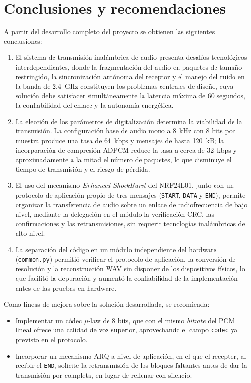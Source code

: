 
\section{Conclusiones y recomendaciones}

A partir del desarrollo completo del proyecto se obtienen las siguientes conclusiones:

\begin{enumerate}
    \item El sistema de transmisión inalámbrica de audio presenta desafíos tecnológicos interdependientes, donde la fragmentación del audio en paquetes de tamaño restringido, la sincronización autónoma del receptor y el manejo del ruido en la banda de \SI{2.4}{\giga\hertz} constituyen los problemas centrales de diseño, cuya solución debe satisfacer simultáneamente la latencia máxima de $60$ segundos, la confiabilidad del enlace y la autonomía energética.

    \item La elección de los parámetros de digitalización determina la viabilidad de la transmisión.
    La configuración base de audio mono a \SI{8}{\kilo\hertz} con $8$ bits por muestra produce una tasa de \SI{64}{kbps} y mensajes de hasta \SI{120}{kB}; la incorporación de compresión ADPCM reduce la tasa a cerca de \SI{32}{kbps} y aproximadamente a la mitad el número de paquetes, lo que disminuye el tiempo de transmisión y el riesgo de pérdida.

    \item El uso del mecanismo \textit{Enhanced ShockBurst} del NRF24L01, junto con un protocolo de aplicación propio de tres mensajes (\texttt{START}, \texttt{DATA} y \texttt{END}), permite organizar la transferencia de audio sobre un enlace de radiofrecuencia de bajo nivel, mediante la delegación en el módulo la verificación CRC, las confirmaciones y las retransmisiones, sin requerir tecnologías inalámbricas de alto nivel.

    \item La separación del código en un módulo independiente del hardware (\texttt{common.py}) permitió verificar el protocolo de aplicación, la conversión de resolución y la reconstrucción WAV sin disponer de los dispositivos físicos, lo que facilitó la depuración y aumentó la confiabilidad de la implementación antes de las pruebas en hardware.
\end{enumerate}

Como líneas de mejora sobre la solución desarrollada, se recomienda:

\begin{itemize}
    \item Implementar un códec $\mu$-law de $8$ bits, que con el mismo \textit{bitrate} del PCM lineal ofrece una calidad de voz superior, aprovechando el campo \texttt{codec} ya previsto en el protocolo.
    \item Incorporar un mecanismo ARQ a nivel de aplicación, en el que el receptor, al recibir el \texttt{END}, solicite la retransmisión de los bloques faltantes antes de dar la transmisión por completa, en lugar de rellenar con silencio.
\end{itemize}
